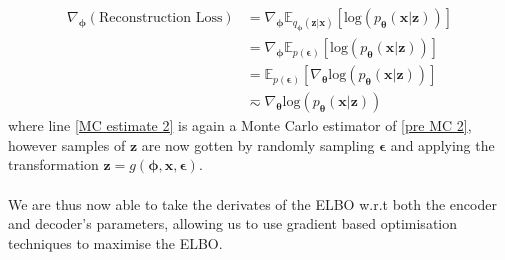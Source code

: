\documentclass{article}
\theoremstyle{definition}
\begin{document}
\begin{align}
    \nabla_{\boldsymbol{\phi}} \left(\text{Reconstruction Loss}\right) &= \nabla_{\boldsymbol{\phi}} \mathbb{E}_{q_{\boldsymbol{\phi}}(\mathbf{z}|\mathbf{x})}\left[\text{log}\left(p_{\boldsymbol{\theta}}(\mathbf{x}| \mathbf{z})\right)\right]\\
    &=\nabla_{\boldsymbol{\phi}} \mathbb{E}_{p(\boldsymbol{\epsilon})}\left[\text{log}\left(p_{\boldsymbol{\theta}}(\mathbf{x}| \mathbf{z})\right)\right]\\
    \label{pre MC 2}&=\mathbb{E}_{p(\boldsymbol{\epsilon})}\left[\nabla_{\boldsymbol{\theta}}\text{log}\left(p_{\boldsymbol{\theta}}(\mathbf{x}| \mathbf{z})\right)\right]\\
    \label{MC estimate 2}
    &\eqsim \nabla_{\boldsymbol{\theta}}\text{log}\left(p_{\boldsymbol{\theta}}(\mathbf{x}| \mathbf{z})\right)
\end{align}
where line \ref{MC estimate 2} is again a Monte Carlo estimator of \ref{pre MC 2}, however samples of $\mathbf{z}$ are now gotten by randomly sampling $\boldsymbol{\epsilon}$ and applying the transformation $\mathbf{z} = g(\boldsymbol{\phi}, \mathbf{x}, \boldsymbol{\epsilon})$.\\\\
We are thus now able to take the derivates of the ELBO w.r.t both the encoder and decoder's parameters, allowing us to use gradient based optimisation techniques to maximise the ELBO.
\\
\end{document}
